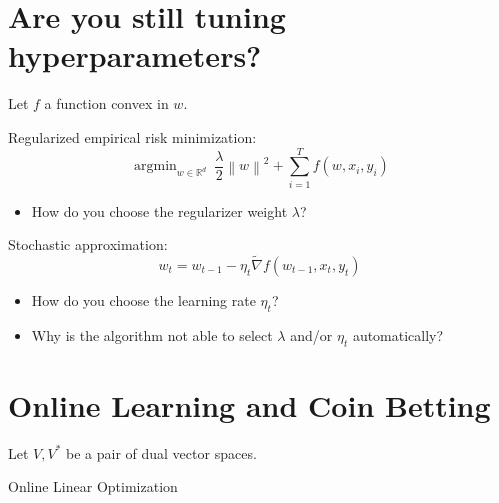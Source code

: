 \documentclass[largefonts,landscape]{sciposter}
\DeclareMathOperator*{\argmin}{argmin}
\newcommand{\R}{\mathbb{R}}
\newcommand{\norm}[1]{\left\|#1\right\|}
\newcommand{\grad}{\nabla}
\begin{document}
\setlength{\parindent}{0em}
\setlength{\columnsep}{4cm}
\begin{multicols}{3}

\section*{Are you still tuning hyperparameters?}

Let $f$ a function convex in $w$.

Regularized empirical risk minimization:
$$
    \argmin_{w \in \R^d} \ \frac{\lambda}{2} \norm{w}^2 + \sum_{i=1}^T f(w, x_i, y_i)
$$
\begin{itemize}
\item How do you choose the regularizer weight $\lambda$?
\end{itemize}

\vspace{1cm}

Stochastic approximation:
$$
    w_t = w_{t-1} - \eta_t \widetilde{\grad} f(w_{t-1}, x_t, y_t)
$$
\begin{itemize}
\item How do you choose the learning rate $\eta_t$?
\end{itemize}

\vspace{1cm}

\begin{itemize}
\item Why is the algorithm not able to select $\lambda$ and/or $\eta_t$ automatically?
\end{itemize}

\section*{Online Learning and Coin Betting}

Let $V,V^*$ be a pair of dual vector spaces.

\vspace{1cm}

\setlength{\fboxrule}{5pt}
\setlength{\fboxsep}{10pt}
\begin{center}
Online Linear Optimization
\vspace{0.3cm}

\colorbox[rgb]{0.80,0.55,0.98}{}
\end{center}


\end{multicols}
\end{document}
